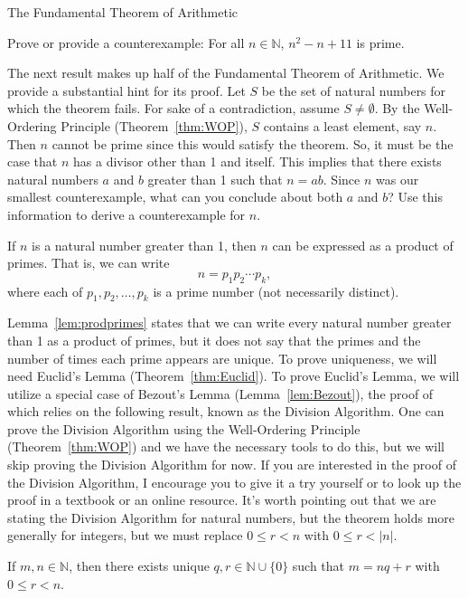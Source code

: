 \begin{section}{The Fundamental Theorem of Arithmetic}
\begin{problem}
Prove or provide a counterexample:  For all $n\in\mathbb{N}$, $n^2-n+11$ is prime.
\end{problem}

The next result makes up half of the Fundamental Theorem of Arithmetic. We provide a substantial hint for its proof. Let $S$ be the set of natural numbers for which the theorem fails.  For sake of a contradiction, assume $S\neq \emptyset$.  By the Well-Ordering Principle (Theorem~\ref{thm:WOP}), $S$ contains a least element, say $n$. Then $n$ cannot be prime since this would satisfy the theorem.  So, it must be the case that $n$ has a divisor other than 1 and itself.  This implies that there exists natural numbers $a$ and $b$ greater than 1 such that $n=ab$.  Since $n$ was our smallest counterexample, what can you conclude about both $a$ and $b$?  Use this information to derive a counterexample for $n$.

\begin{lemma}\label{lem:prodprimes}
If $n$ is a natural number greater than 1, then $n$ can be expressed as a product of primes.  That is, we can write
\[
n=p_1 p_2 \cdots p_k,
\]
where each of $p_1, p_2, \ldots, p_k$ is a prime number (not necessarily distinct).
\end{lemma}

Lemma~\ref{lem:prodprimes} states that we can write every natural number greater than 1 as a product of primes, but it does not say that the primes and the number of times each prime appears are unique.  To prove uniqueness, we will need Euclid's Lemma (Theorem~\ref{thm:Euclid}). To prove Euclid's Lemma, we will utilize a special case of Bezout's Lemma (Lemma~\ref{lem:Bezout}), the proof of which relies on the following result, known as the Division Algorithm. One can prove the Division Algorithm using the Well-Ordering Principle (Theorem~\ref{thm:WOP}) and we have the necessary tools to do this, but we will skip proving the Division Algorithm for now. If you are interested in the proof of the Division Algorithm, I encourage you to give it a try yourself or to look up the proof in a textbook or an online resource.  It's worth pointing out that we are stating the Division Algorithm for natural numbers, but the theorem holds more generally for integers, but we must replace $0\leq r<n$ with $0\leq r<|n|$.

\begin{theorem}\label{thm:DivisonAlgorthm}
If $m,n\in\mathbb{N}$, then there exists unique $q,r\in\mathbb{N}\cup\{0\}$ such that $m=nq+r$ with $0\leq r<n$.
\end{theorem}


\end{section}
